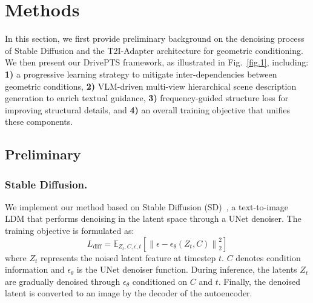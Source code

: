 \section{Methods}
In this section, we first provide preliminary background on the denoising process of Stable Diffusion and the T2I-Adapter architecture for geometric conditioning. 
We then present our DrivePTS framework, as illustrated in Fig.~\ref{fig.1}, including: \textbf{1)} a progressive learning strategy to mitigate inter-dependencies between geometric conditions, \textbf{2)} VLM-driven multi-view hierarchical scene description generation to enrich textual guidance, \textbf{3)} frequency-guided structure loss for improving structural details, and \textbf{4)} an overall training objective that unifies these components.
\subsection{Preliminary}
\subsubsection{Stable Diffusion.} We implement our method based on Stable Diffusion (SD)~\cite{rombach2022high}, a text-to-image LDM that performs denoising in the latent space through a UNet denoiser. The training objective is formulated as:
\begin{equation}
	L_{\text{diff}} = \mathbb{E}_{Z_{t},C,\epsilon,t}\left[\left\|\epsilon - \epsilon_{\theta}(Z_t,C)\right\|_2^2\right]
\end{equation}
where $Z_{t}$
represents the noised latent feature at timestep $t$. 
$C$ denotes condition information  and $\epsilon_{\theta}$ is the UNet denoiser function.
During inference, the latents $Z_t$ are gradually denoised through $\epsilon_\theta$ conditioned on $C$ and $t$. Finally, the denoised latent is converted to an image by the decoder of the autoencoder.
